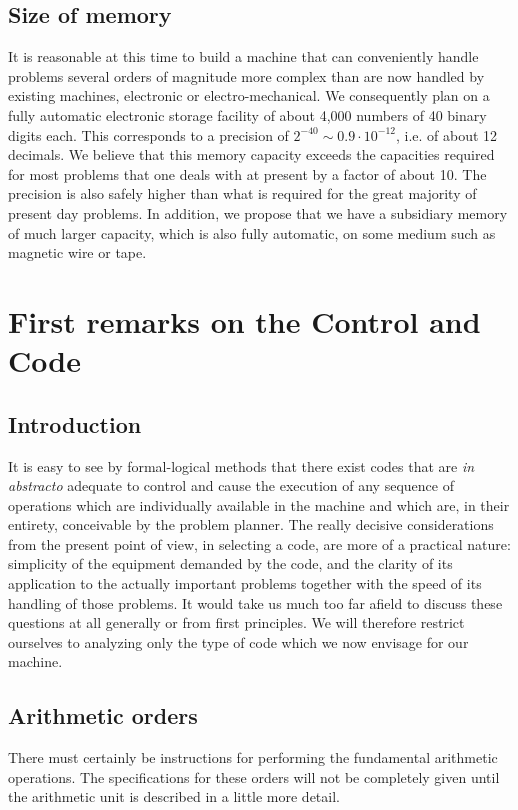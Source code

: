 \documentclass[12pt]{amsart}
\begin{document}
\subsection{Size of memory}
It is reasonable at this time to build a machine that can conveniently handle problems several orders of magnitude more complex than are now handled by existing machines, electronic or electro-mechanical. We consequently plan on a fully automatic electronic storage facility of about 4,000 numbers of 40 binary digits each. This corresponds to a precision of $2^{-40} \sim 0.9 \cdot 10^{-12}$, i.e. of about 12 decimals. We believe that this memory capacity exceeds the capacities required for most problems that one deals with at present by a factor of about 10. The precision is also safely higher than what is required for the great majority of present day problems. In addition, we propose that we have a subsidiary memory of much larger capacity, which is also fully automatic, on some medium such as magnetic wire or tape.

\section{First remarks on the Control and Code}

\subsection{Introduction}
It is easy to see by formal-logical methods that there exist codes that are \emph{in abstracto} adequate to control and cause the execution of any sequence of operations which are individually available in the machine and which are, in their entirety, conceivable by the problem planner. The really decisive considerations from the present point of view, in selecting a code, are more of a practical nature: simplicity of the equipment demanded by the code, and the clarity of its application to the actually important problems together with the speed of its handling of those problems. It would take us much too far afield to discuss these questions at all generally or from first principles. We will therefore restrict ourselves to analyzing only the type of code which we now envisage for our machine.

\subsection{Arithmetic orders}
There must certainly be instructions for performing the fundamental arithmetic operations. The specifications for these orders will not be completely given until the arithmetic unit is described in a little more detail.
\end{document}
